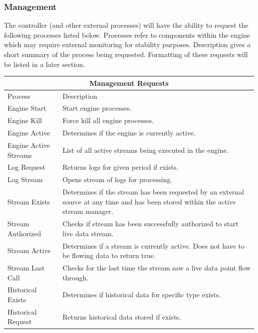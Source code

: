 \documentclass{article}
\begin{document}
\subsubsection{Management}

The controller (and other external processes) will have the ability to request the following processes listed below. Processes refer to components within the engine which may require external monitoring for stability purposes. Description gives a short summary of the process being requested. Formatting of these requests will be listed in a later section.\\

\begin{center}
\begin{tabular}{ | p{5cm} || p{11cm} | }
\hline
\multicolumn{2}{|c|}{Management Requests}\\
\hline
Process & Description\\
\hline
Engine Start & Start engine processes.\\
\hline
Engine Kill & Force kill all engine processes.\\
\hline
Engine Active & Determines if the engine is currently active.\\
\hline
Engine Active Streams & List of all active streams being executed in the engine.\\
\hline
Log Request & Returns logs for given period if exists.\\
\hline
Log Stream & Opens stream of logs for processing.\\
\hline
Stream Exists & Determines if the stream has been requested by an external source at any time and has been stored within the active stream manager.\\
\hline
Stream Authorized & Checks if stream has been successfully authorized to start live data stream.\\
\hline
Stream Active & Determines if a stream is currently active. Does not have to be flowing data to return true.\\
\hline
Stream Last Call & Checks for the last time the stream saw a live data point flow through.\\ 
\hline
Historical Exists & Determines if historical data for specific type exists.\\
\hline
Historical Request & Returns historical data stored if exists.\\
\hline
\end{tabular}
\end{center}
\end{document}
